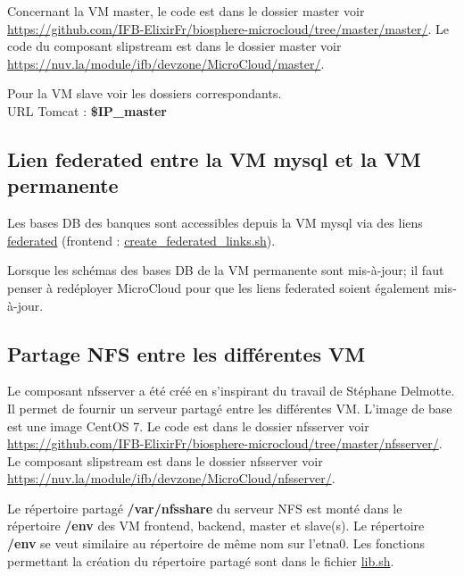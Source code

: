 Concernant la VM master, le code est dans le dossier master voir
\url{https://github.com/IFB-ElixirFr/biosphere-microcloud/tree/master/master/}.
Le code du composant slipstream est dans le dossier master voir \url{https://nuv.la/module/ifb/devzone/MicroCloud/master/}.

Pour la VM slave voir les dossiers correspondants.\\

URL Tomcat : \textbf{\$IP\_master}

\subsection{Lien federated entre la VM mysql et  la VM permanente}
Les bases DB des banques sont accessibles depuis la VM mysql via des liens \href{https://dev.mysql.com/doc/refman/8.0/en/federated-storage-engine.html}{federated} (frontend : \href{https://github.com/IFB-ElixirFr/biosphere-microcloud/blob/master/frontend/create_federated_links.sh}{create\_federated\_links.sh}).\\

\begin{mycolorbox}Lorsque les schémas des bases DB de la VM permanente sont mis-à-jour; il faut penser à redéployer MicroCloud pour que les liens federated soient également mis-à-jour.
\end{mycolorbox}

\subsection{Partage NFS entre les différentes VM}

\label{nfsserver} Le composant nfsserver a été créé en s'inspirant du travail de Stéphane Delmotte. Il permet de fournir un serveur partagé entre les différentes VM.
L'image de base est une image CentOS 7.
Le code est dans le dossier nfsserver voir  \url{https://github.com/IFB-ElixirFr/biosphere-microcloud/tree/master/nfsserver/}.
Le composant slipstream est dans le dossier nfsserver voir
\url{https://nuv.la/module/ifb/devzone/MicroCloud/nfsserver/}.

Le répertoire partagé \textbf{/var/nfsshare} du serveur NFS est monté dans le répertoire \textbf{/env}
des VM frontend, backend, master et slave(s). Le répertoire \textbf{/env} se veut similaire au répertoire de même nom sur l’etna0. 
Les fonctions permettant la création du répertoire partagé sont dans le fichier \href{https://github.com/IFB-ElixirFr/biosphere-microcloud/blob/master/lib.sh}{lib.sh}.